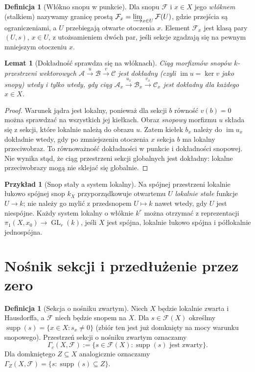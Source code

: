 \documentclass[11pt,a4paper,oneside]{report}
\theoremstyle{plain}
\newtheorem{lemat}[twierdzenie]{Lemat}
\theoremstyle{definition}
\newtheorem{definicja}[twierdzenie]{Definicja}
\newtheorem{przyklad}[twierdzenie]{Przykład}
\theoremstyle{remark}
\begin{document}
\begin{definicja}[Włókno snopu w punkcie]
Dla snopu $\mathcal F$ i $x\in X$ jego \emph{włóknem} (stalkiem)
nazywamy granicę prostą
$\mathcal F_x=\varinjlim_{x\in U}\mathcal F(U)$, gdzie przejścia
są ograniczeniami, a $U$ przebiegają otwarte otoczenia $x$.
Element $\mathcal F_x$ jest klasą pary $(U,s)$, $x\in U$,
z utożsamieniem dwóch par, jeśli sekcje zgadzają się
na pewnym mniejszym otoczeniu $x$.
\end{definicja}

\begin{lemat}[Dokładność sprawdza się na włóknach]
\label{lem:stalk-exact-v12}
Ciąg morfizmów snopów $k$-przestrzeni wektorowych
$\mathcal A\xrightarrow{u}\mathcal B\xrightarrow{v}\mathcal C$
jest dokładny (czyli $\operatorname{im}u=\ker v$ jako snopy)
wtedy i tylko wtedy, gdy ciąg
$\mathcal A_x\xrightarrow{u_x}\mathcal B_x\xrightarrow{v_x}\mathcal C_x$
jest dokładny dla każdego $x\in X$.
\end{lemat}
\begin{proof}
Warunek jądra jest lokalny, ponieważ dla sekcji $b$ równość $v(b)=0$
można sprawdzać na wszystkich jej kiełkach. Obraz \emph{snopowy}
morfizmu $u$ składa się z sekcji, które lokalnie należą do obrazu $u$.
Zatem kiełek $b_x$ należy do $\operatorname{im}u_x$ dokładnie wtedy,
gdy po zmniejszeniu otoczenia $x$ sekcja $b$ ma lokalny przeciwobraz.
To równoważność dokładności w punkcie i dokładności snopowej.
Nie wynika stąd, że ciąg przestrzeni sekcji globalnych jest dokładny:
lokalne przeciwobrazy mogą nie sklejać się globalnie.
\end{proof}

\begin{przyklad}[Snop stały a system lokalny]
Na spójnej przestrzeni lokalnie łukowo spójnej snop $k_X$
przyporządkowuje otwartemu $U$ \emph{lokalnie stałe} funkcje $U\to k$;
nie należy go mylić z przedsnopem $U\mapsto k$ nawet wtedy,
gdy $U$ jest niespójne. Każdy system lokalny o włóknie $k^r$
można otrzymać z reprezentacji
$\pi_1(X,x_0)\to\operatorname{GL}_r(k)$,
jeśli $X$ jest spójna, lokalnie łukowo spójna i półlokalnie jednospójna.
\end{przyklad}

\section{Nośnik sekcji i przedłużenie przez zero}
\begin{definicja}[Sekcja o nośniku zwartym]
\label{def:gamma-c-v12}
Niech $X$ będzie lokalnie zwarta i Hausdorffa, a $\mathcal F$
niech będzie snopem na $X$. Dla $s\in\mathcal F(X)$ określmy
$\operatorname{supp}(s)=\{x\in X:s_x\ne0\}$
(zbiór ten jest już domknięty na mocy warunku snopowego).
Przestrzeń sekcji o nośniku zwartym oznaczamy
\[\Gamma_c(X,\mathcal F)
  :=\{s\in\mathcal F(X):\operatorname{supp}(s)\text{ jest zwarty}\}.\]
Dla domkniętego $Z\subseteq X$ analogicznie oznaczamy
$\Gamma_Z(X,\mathcal F)=\{s:\operatorname{supp}(s)\subseteq Z\}$.
\end{definicja}
\end{document}
